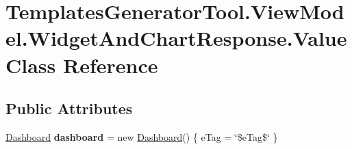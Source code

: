\hypertarget{class_templates_generator_tool_1_1_view_model_1_1_widget_and_chart_response_1_1_value}{}\section{Templates\+Generator\+Tool.\+View\+Model.\+Widget\+And\+Chart\+Response.\+Value Class Reference}
\label{class_templates_generator_tool_1_1_view_model_1_1_widget_and_chart_response_1_1_value}
\subsection*{Public Attributes}
\begin{DoxyCompactItemize}
\item 
\mbox{\label{class_templates_generator_tool_1_1_view_model_1_1_widget_and_chart_response_1_1_value_a118636b0c921bd76f1c288fe349a50b2}} 
\mbox{\hyperlink{class_templates_generator_tool_1_1_view_model_1_1_widget_and_chart_response_1_1_dashboard}{Dashboard}} {\bfseries dashboard} = new \mbox{\hyperlink{class_templates_generator_tool_1_1_view_model_1_1_widget_and_chart_response_1_1_dashboard}{Dashboard}}() \{ e\+Tag = \char`\"{}\$e\+Tag\$\char`\"{} \}
\end{DoxyCompactItemize}

